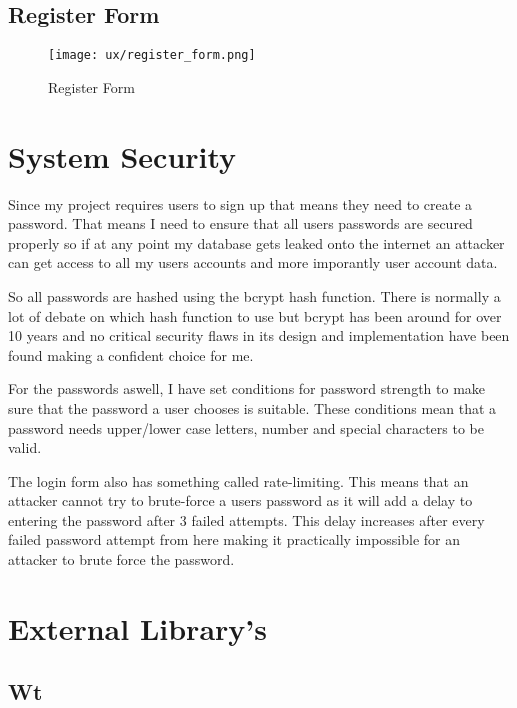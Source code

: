 \subsection{Register Form}

\begin{figure}[H]
\hspace{-2cm}
\begin{center}
\texttt{[image: ux/register\_form.png]}
\end{center} 
\caption{Register Form}
\label{ux_register_form}
\end{figure}


\section{System Security}

Since my project requires users to sign up that means they need to create a password. That means I need to ensure that all users passwords are secured properly so if at any point my database gets leaked onto the internet an attacker can get access to all my users accounts and more imporantly user account data. 

So all passwords are hashed using the bcrypt hash function. There is normally a lot of debate on which hash function to use but bcrypt has been around for over 10 years and no critical security flaws in its design and implementation have been found making a confident choice for me.

For the passwords aswell, I have set conditions for password strength to make sure that the password a user chooses is suitable. These conditions mean that a password needs upper/lower case letters, number and special characters to be valid.

The login form also has something called rate-limiting. This means that an attacker cannot try to brute-force a users password as it will add a delay to entering the password after 3 failed attempts. This delay increases after every failed password attempt from here making it practically impossible for an attacker to brute force the password.

\section{External Library's}
\subsection{Wt}

